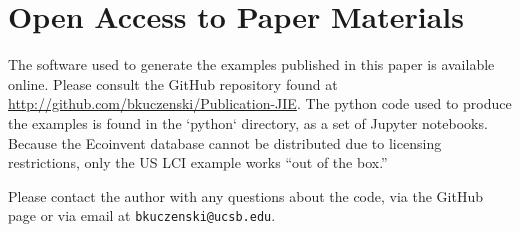 \section{Open Access to Paper Materials}
The software used to generate the examples published in this paper is available online.  Please consult the GitHub repository found at \url{http://github.com/bkuczenski/Publication-JIE}.  The python code used to produce the examples is found in the `python` directory, as a set of Jupyter notebooks.  Because the Ecoinvent database cannot be distributed due to licensing restrictions, only the US LCI example works ``out of the box.''

Please contact the author with any questions about the code, via the GitHub page or via email at \texttt{bkuczenski@ucsb.edu}.
